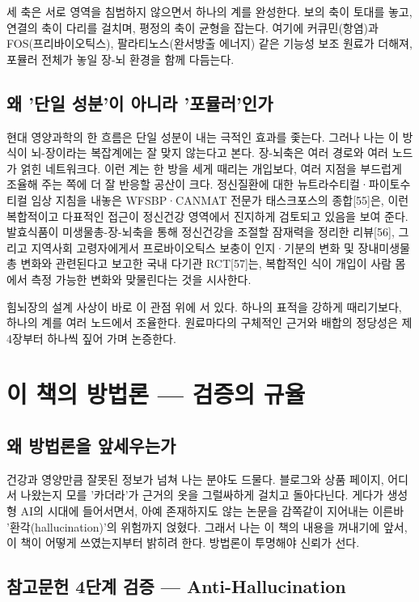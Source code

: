 \documentclass[12pt,oneside]{book}
\begin{document}
세 축은 서로 영역을 침범하지 않으면서 하나의 계를 완성한다. 보의 축이 토대를 놓고, 연결의 축이 다리를 걸치며, 평정의 축이 균형을 잡는다. 여기에 커큐민(항염)과 FOS(프리바이오틱스), 팔라티노스(완서방출 에너지) 같은 기능성 보조 원료가 더해져, 포뮬러 전체가 놓일 장-뇌 환경을 함께 다듬는다.

\subsection{왜 '단일 성분'이 아니라 '포뮬러'인가}

현대 영양과학의 한 흐름은 단일 성분이 내는 극적인 효과를 좇는다. 그러나 나는 이 방식이 뇌-장이라는 복잡계에는 잘 맞지 않는다고 본다. 장-뇌축은 여러 경로와 여러 노드가 얽힌 네트워크다. 이런 계는 한 방을 세게 때리는 개입보다, 여러 지점을 부드럽게 조율해 주는 쪽에 더 잘 반응할 공산이 크다. 정신질환에 대한 뉴트라수티컬·파이토수티컬 임상 지침을 내놓은 WFSBP·CANMAT 전문가 태스크포스의 종합[55]은, 이런 복합적이고 다표적인 접근이 정신건강 영역에서 진지하게 검토되고 있음을 보여 준다. 발효식품이 미생물총-장-뇌축을 통해 정신건강을 조절할 잠재력을 정리한 리뷰[56], 그리고 지역사회 고령자에게서 프로바이오틱스 보충이 인지·기분의 변화 및 장내미생물총 변화와 관련된다고 보고한 국내 다기관 RCT[57]는, 복합적인 식이 개입이 사람 몸에서 측정 가능한 변화와 맞물린다는 것을 시사한다.

힘뇌장의 설계 사상이 바로 이 관점 위에 서 있다. 하나의 표적을 강하게 때리기보다, 하나의 계를 여러 노드에서 조율한다. 원료마다의 구체적인 근거와 배합의 정당성은 제4장부터 하나씩 짚어 가며 논증한다.

\section{이 책의 방법론 — 검증의 규율}

\subsection{왜 방법론을 앞세우는가}

건강과 영양만큼 잘못된 정보가 넘쳐 나는 분야도 드물다. 블로그와 상품 페이지, 어디서 나왔는지 모를 '카더라'가 근거의 옷을 그럴싸하게 걸치고 돌아다닌다. 게다가 생성형 AI의 시대에 들어서면서, 아예 존재하지도 않는 논문을 감쪽같이 지어내는 이른바 '환각(hallucination)'의 위험까지 얹혔다. 그래서 나는 이 책의 내용을 꺼내기에 앞서, 이 책이 어떻게 쓰였는지부터 밝히려 한다. 방법론이 투명해야 신뢰가 선다.

\subsection{참고문헌 4단계 검증 — Anti-Hallucination}
\end{document}
